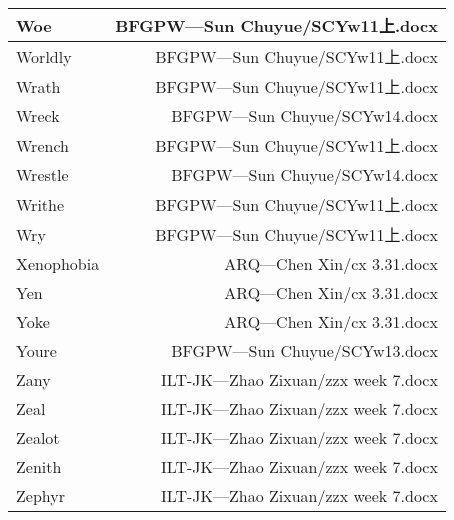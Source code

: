 \documentclass{article}
\begin{document}
\begin{center}
\begin{longtable}{|l|r|}
Woe  &  BFGPW---Sun Chuyue/SCYw11上.docx\\  
\hline
Worldly  &  BFGPW---Sun Chuyue/SCYw11上.docx\\  
\hline
Wrath  &  BFGPW---Sun Chuyue/SCYw11上.docx\\  
\hline
Wreck  &  BFGPW---Sun Chuyue/SCYw14.docx\\  
\hline
Wrench  &  BFGPW---Sun Chuyue/SCYw11上.docx\\  
\hline
Wrestle  &  BFGPW---Sun Chuyue/SCYw14.docx\\  
\hline
Writhe  &  BFGPW---Sun Chuyue/SCYw11上.docx\\  
\hline
Wry  &  BFGPW---Sun Chuyue/SCYw11上.docx\\  
\hline
Xenophobia  &  ARQ---Chen Xin/cx 3.31.docx\\  
\hline
Yen  &  ARQ---Chen Xin/cx 3.31.docx\\  
\hline
Yoke  &  ARQ---Chen Xin/cx 3.31.docx\\  
\hline
Youre  &  BFGPW---Sun Chuyue/SCYw13.docx\\  
\hline
Zany  &  ILT-JK---Zhao Zixuan/zzx week 7.docx\\  
\hline
Zeal  &  ILT-JK---Zhao Zixuan/zzx week 7.docx\\  
\hline
Zealot  &  ILT-JK---Zhao Zixuan/zzx week 7.docx\\  
\hline
Zenith  &  ILT-JK---Zhao Zixuan/zzx week 7.docx\\  
\hline
Zephyr  &  ILT-JK---Zhao Zixuan/zzx week 7.docx\\  

\end{longtable}
\end{center}
\end{document}
